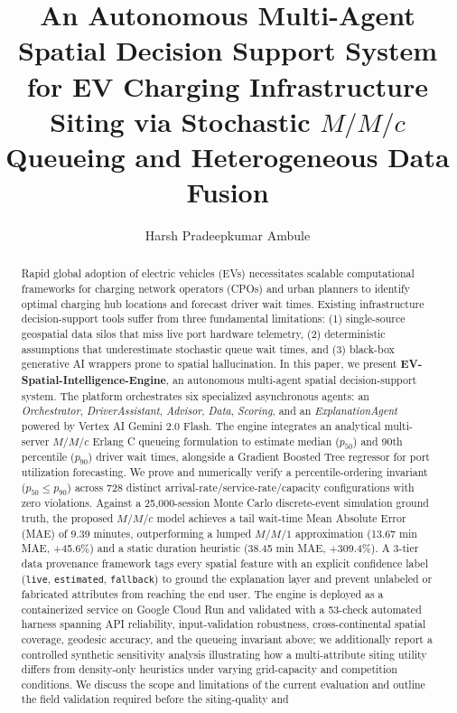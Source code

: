\documentclass[preprint,12pt,authoryear]{elsarticle}
\begin{document}
\begin{frontmatter}

\title{An Autonomous Multi-Agent Spatial Decision Support System for EV Charging Infrastructure Siting via Stochastic $M/M/c$ Queueing and Heterogeneous Data Fusion}

\author[inst1]{Harsh Pradeepkumar Ambule}


\begin{abstract}
Rapid global adoption of electric vehicles (EVs) necessitates scalable computational frameworks for charging network operators (CPOs) and urban planners to identify optimal charging hub locations and forecast driver wait times. Existing infrastructure decision-support tools suffer from three fundamental limitations: (1) single-source geospatial data silos that miss live port hardware telemetry, (2) deterministic assumptions that underestimate stochastic queue wait times, and (3) black-box generative AI wrappers prone to spatial hallucination. In this paper, we present \textbf{EV-Spatial-Intelligence-Engine}, an autonomous multi-agent spatial decision-support system. The platform orchestrates six specialized asynchronous agents: an \textit{Orchestrator}, \textit{DriverAssistant}, \textit{Advisor}, \textit{Data}, \textit{Scoring}, and an \textit{ExplanationAgent} powered by Vertex AI Gemini 2.0 Flash. The engine integrates an analytical multi-server $M/M/c$ Erlang C queueing formulation to estimate median ($p_{50}$) and 90th percentile ($p_{90}$) driver wait times, alongside a Gradient Boosted Tree regressor for port utilization forecasting. We prove and numerically verify a percentile-ordering invariant ($p_{50}\le p_{90}$) across 728 distinct arrival-rate/service-rate/capacity configurations with zero violations. Against a 25{,}000-session Monte Carlo discrete-event simulation ground truth, the proposed $M/M/c$ model achieves a tail wait-time Mean Absolute Error (MAE) of 9.39 minutes, outperforming a lumped $M/M/1$ approximation (13.67 min MAE, +45.6\%) and a static duration heuristic (38.45 min MAE, +309.4\%). A 3-tier data provenance framework tags every spatial feature with an explicit confidence label (\texttt{live}, \texttt{estimated}, \texttt{fallback}) to ground the explanation layer and prevent unlabeled or fabricated attributes from reaching the end user. The engine is deployed as a containerized service on Google Cloud Run and validated with a 53-check automated harness spanning API reliability, input-validation robustness, cross-continental spatial coverage, geodesic accuracy, and the queueing invariant above; we additionally report a controlled synthetic sensitivity analysis illustrating how a multi-attribute siting utility differs from density-only heuristics under varying grid-capacity and competition conditions. We discuss the scope and limitations of the current evaluation and outline the field validation required before the siting-quality and 
\end{abstract}
\end{frontmatter}
\end{document}
